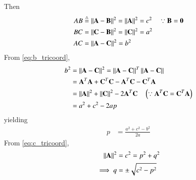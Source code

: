 \begin{enumerate}[label=\arabic*.,ref=\thesubsection.\theenumi]
Then
\begin{align}
\label{eq:c_tricoord}
AB &\stackrel{\triangle}{=} \left\lVert\mathbf{A}-\mathbf{B}\right\rVert^2 = \left\lVert\mathbf{A}\right\rVert^2  = c^2 \quad \because \mathbf{B} = \mathbf{0}
\\
\label{eq:a_tricoord}
BC &= \left\lVert\mathbf{C}-\mathbf{B}\right\rVert^2 = \left\lVert\mathbf{C}\right\rVert^2  = a^2
\\
AC &= \left\lVert\mathbf{A}-\mathbf{C}\right\rVert^2 =    b^2
\label{eq:b_tricoord}
\end{align}
%
From \eqref{eq:b_tricoord},
\begin{align}
b^2 &=\left\lVert\mathbf{A}-\mathbf{C}\right\rVert^2 = \left\lVert\mathbf{A}-\mathbf{C}\right\rVert^T\left\lVert\mathbf{A}-\mathbf{C}\right\rVert  
\\
&= \mathbf{A}^T\mathbf{A}+\mathbf{C}^T\mathbf{C}-\mathbf{A}^T\mathbf{C} - \mathbf{C}^T\mathbf{A} 
\\
&= \left\lVert\mathbf{A}\right\rVert^2 + \left\lVert\mathbf{C}\right\rVert^2 - 2\mathbf{A}^T\mathbf{C} \quad \left(\because \mathbf{A}^T\mathbf{C} = \mathbf{C}^T\mathbf{A} \right) 
\\
&= a^2+c^2-2ap
\end{align}
%
yielding
\begin{align}
p&= \frac{a^2+c^2-b^2}{2a}
\end{align}
%
From \eqref{eq:c_tricoord}, 
\begin{align}
\left\lVert\mathbf{A}\right\rVert^2 &= c^2 = p^2+q^2
\\
\implies q&= \pm \sqrt{c^2-p^2}
\end{align}


\end{enumerate}
